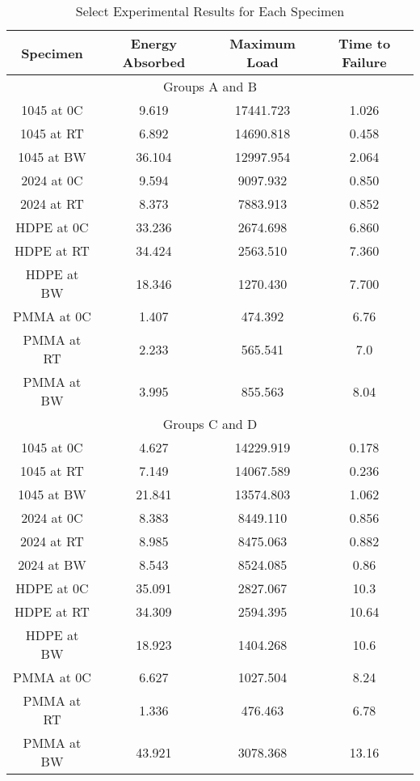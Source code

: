 \documentclass{article}
\begin{document}
\begin{table}[!h!]
    \centering
    \caption{Select Experimental Results for Each Specimen }
    \renewcommand{\arraystretch}{1.5}
    \begin{tabular}{|c|c|c|c|}
        \toprule
        \hline
        Specimen & Energy Absorbed & Maximum Load & Time to Failure \\
        \toprule

        \bottomrule
        \multicolumn{4}{|c|}{Groups A and B} \\
        \toprule
        \bottomrule
        1045 at 0C & 9.619 & 17441.723 & 1.026 \\ 
        \hline
        1045 at RT & 6.892 & 14690.818 & 0.458 \\ 
        \hline
        1045 at BW & 36.104 & 12997.954 & 2.064 \\ 
        \hline
        2024 at 0C & 9.594 & 9097.932 & 0.850 \\ 
        \hline
        2024 at RT & 8.373 & 7883.913 & 0.852 \\ 
        \hline
        HDPE at 0C & 33.236 & 2674.698 & 6.860 \\ 
        \hline
        HDPE at RT & 34.424 & 2563.510 & 7.360 \\ 
        \hline
        HDPE at BW & 18.346 & 1270.430 & 7.700 \\ 
        \hline
        PMMA at 0C & 1.407 & 474.392 & 6.76 \\ 
        \hline
        PMMA at RT & 2.233 & 565.541 & 7.0 \\ 
        \hline
        PMMA at BW & 3.995 & 855.563 & 8.04 \\ 
        \toprule
        
        \bottomrule
        \multicolumn{4}{|c|}{Groups C and D} \\
        \toprule
        \bottomrule
        1045 at 0C & 4.627 & 14229.919 & 0.178 \\ 
        \hline
        1045 at RT & 7.149 & 14067.589 & 0.236 \\ 
        \hline
        1045 at BW & 21.841 & 13574.803 & 1.062 \\ 
        \hline
        2024 at 0C & 8.383 & 8449.110 & 0.856 \\ 
        \hline
        2024 at RT & 8.985 & 8475.063 & 0.882 \\ 
        \hline
        2024 at BW & 8.543 & 8524.085 & 0.86 \\ 
        \hline
        HDPE at 0C & 35.091 & 2827.067 & 10.3 \\ 
        \hline
        HDPE at RT & 34.309 & 2594.395 & 10.64 \\ 
        \hline
        HDPE at BW & 18.923 & 1404.268 & 10.6 \\ 
        \hline
        PMMA at 0C & 6.627 & 1027.504 & 8.24 \\ 
        \hline
        PMMA at RT & 1.336 & 476.463 & 6.78 \\ 
        \hline
        PMMA at BW & 43.921 & 3078.368 & 13.16 \\ 
        \toprule
    \end{tabular}
    \label{tab:q2}
\end{table}
\end{document}
